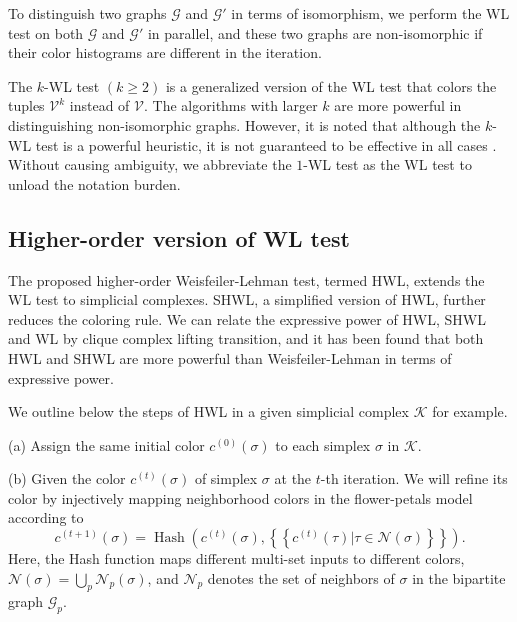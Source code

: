 \documentclass[letterpaper]{article} \usepackage{aaai24}
\newcommand \multiset[1] {\left\{\!\!\left\{#1\right\}\!\!\right\} }
\theoremstyle{plain}
\theoremstyle{definition}
\theoremstyle{remark}
\begin{document}
To distinguish two graphs $\mathcal{G}$ and $\mathcal{G}'$ in terms of isomorphism, we perform the WL test on both $\mathcal{G}$ and $\mathcal{G}'$ in parallel, and these two graphs are non-isomorphic if their color histograms are different in the iteration.




The $k$-WL test $(k \geq 2)$ is a generalized version of the WL test that colors the tuples $\mathcal{V}^k$ instead of $\mathcal{V}$. The algorithms with larger $k$ are more powerful in distinguishing non-isomorphic graphs. However, it is noted that although the $k$-WL test is a powerful heuristic, it is not guaranteed to be effective in all cases \cite{CFI1992}. Without causing ambiguity,  we abbreviate the $1$-WL test as the WL test to unload the notation burden.




\subsection{Higher-order version of WL test}
\label{appendix:HWL_SHWL}

The proposed higher-order Weisfeiler-Lehman test, termed HWL, extends the WL test to simplicial complexes. 
SHWL, a simplified version of HWL, further reduces the coloring rule.
We can relate the expressive power of HWL, SHWL and WL by clique complex lifting transition, and it has been found that both HWL and SHWL are more powerful than Weisfeiler-Lehman in terms of expressive power.



We outline below the steps of HWL in a given simplicial complex $\mathcal{K}$ for example.

(a) Assign the same initial color $c^{(0)}(\sigma)$ to each simplex $\sigma$ in $\mathcal{K}$.

(b) Given the color  $c^{(t)}(\sigma)$ of simplex $\sigma$ at the $t$-th iteration. We will refine its color by injectively mapping neighborhood colors in the flower-petals model according to
\begin{equation}
    c^{(t+1)}(\sigma) = \operatorname{Hash}\left(c^{(t)}(\sigma), \multiset{c^{(t)}(\tau)|\tau \in \mathcal{N}(\sigma) } \right).
\end{equation}
Here, the Hash function maps different multi-set inputs to different colors, $\mathcal{N}(\sigma)=\bigcup_p \mathcal{N}_p(\sigma)$, and $\mathcal{N}_p$ denotes the set of neighbors of $\sigma$ in the bipartite graph $\mathcal{G}_p$.
\end{document}
